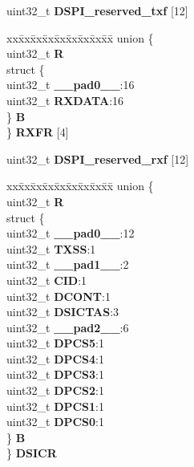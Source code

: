 \begin{DoxyCompactItemize}
\begin{tabbing}
\end{tabbing}\item 
\mbox{\label{structDSPI__tag_a007af3355972cb4bf7c052a81dfb686b}} 
uint32\+\_\+t {\bfseries D\+S\+P\+I\+\_\+reserved\+\_\+txf} \mbox{[}12\mbox{]}
\item 
\mbox{\label{structDSPI__tag_a8867a80db9956ed55a8d33218fece82e}} 
\begin{tabbing}
xx\=xx\=xx\=xx\=xx\=xx\=xx\=xx\=xx\=\kill
union \{\\
\>uint32\_t {\bfseries R}\\
\>struct \{\\
\>\>uint32\_t {\bfseries \_\_pad0\_\_}:16\\
\>\>uint32\_t {\bfseries RXDATA}:16\\
\>\} {\bfseries B}\\
\} {\bfseries RXFR} \mbox{[}4\mbox{]}\\

\end{tabbing}\item 
\mbox{\label{structDSPI__tag_a7cfdf5b32a0391a859cb79278a46a968}} 
uint32\+\_\+t {\bfseries D\+S\+P\+I\+\_\+reserved\+\_\+rxf} \mbox{[}12\mbox{]}
\item 
\mbox{\label{structDSPI__tag_a41db42aff6cb320925e6020e7a58f1bb}} 
\begin{tabbing}
xx\=xx\=xx\=xx\=xx\=xx\=xx\=xx\=xx\=\kill
union \{\\
\>uint32\_t {\bfseries R}\\
\>struct \{\\
\>\>uint32\_t {\bfseries \_\_pad0\_\_}:12\\
\>\>uint32\_t {\bfseries TXSS}:1\\
\>\>uint32\_t {\bfseries \_\_pad1\_\_}:2\\
\>\>uint32\_t {\bfseries CID}:1\\
\>\>uint32\_t {\bfseries DCONT}:1\\
\>\>uint32\_t {\bfseries DSICTAS}:3\\
\>\>uint32\_t {\bfseries \_\_pad2\_\_}:6\\
\>\>uint32\_t {\bfseries DPCS5}:1\\
\>\>uint32\_t {\bfseries DPCS4}:1\\
\>\>uint32\_t {\bfseries DPCS3}:1\\
\>\>uint32\_t {\bfseries DPCS2}:1\\
\>\>uint32\_t {\bfseries DPCS1}:1\\
\>\>uint32\_t {\bfseries DPCS0}:1\\
\>\} {\bfseries B}\\
\} {\bfseries DSICR}\\


\end{tabbing}
\end{DoxyCompactItemize}
